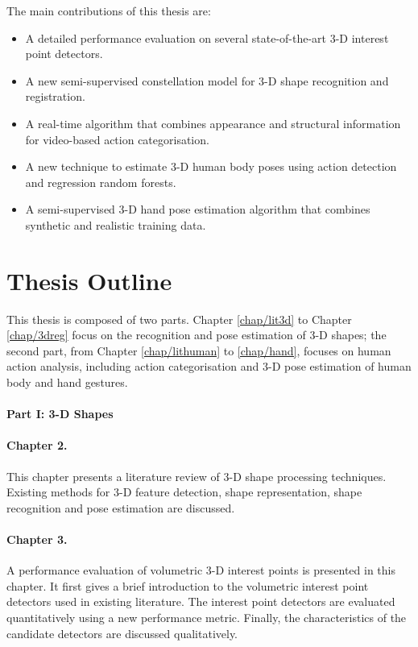The main contributions of this thesis are:
\begin{itemize}
	\item A detailed performance evaluation on several state-of-the-art 3-D interest point detectors.
	\item A new semi-supervised constellation model for 3-D shape recognition and registration. 
	\item A real-time algorithm that combines appearance and structural information for video-based action categorisation. 
	\item A new technique to estimate 3-D human body poses using action detection and regression random forests. 
	\item A semi-supervised 3-D hand pose estimation algorithm that combines synthetic and realistic training data. 
\end{itemize}

\section{Thesis Outline}

This thesis is composed of two parts. Chapter \ref{chap/lit3d} to Chapter \ref{chap/3dreg} focus on the recognition and pose estimation of 3-D shapes; the second part, from Chapter \ref{chap/lithuman} to \ref{chap/hand}, focuses on human action analysis, including action categorisation and 3-D pose estimation of human body and hand gestures.  

\paragraph{Part I: 3-D Shapes}

\paragraph{Chapter 2.} 
This chapter presents a literature review of 3-D shape processing techniques.  
Existing methods for 3-D feature detection, shape representation, shape recognition and pose estimation are discussed.  

\paragraph{Chapter 3.} 
A performance evaluation of volumetric 3-D interest points is presented in this chapter. 
It first gives a brief introduction to the volumetric interest point detectors used in existing literature.
The interest point detectors are evaluated quantitatively using a new performance metric.
Finally, the characteristics of the candidate detectors are discussed qualitatively. 

